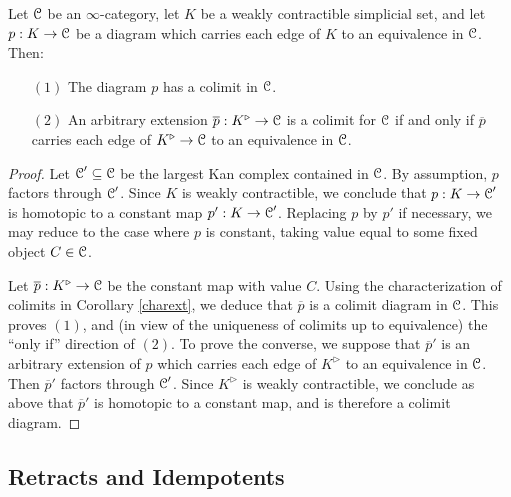 \begin{corollary}\label{silt}
Let $\operatorname{\mathcal{C}}$ be an $\infty$-category, let $K$ be a weakly contractible simplicial set, and let
$p: K \rightarrow \operatorname{\mathcal{C}}$ be a diagram which carries each edge of $K$ to an equivalence in $\operatorname{\mathcal{C}}$.
Then:
\begin{itemize}
\item[$(1)$] The diagram $p$ has a colimit in $\operatorname{\mathcal{C}}$.
\item[$(2)$] An arbitrary extension $\overline{p}: K^{\triangleright} \rightarrow \operatorname{\mathcal{C}}$
is a colimit for $\operatorname{\mathcal{C}}$ if and only if $\overline{p}$ carries each edge of
$K^{\triangleright} \rightarrow \operatorname{\mathcal{C}}$ to an equivalence in $\operatorname{\mathcal{C}}$.
\end{itemize}
\end{corollary}

\begin{proof}
Let $\operatorname{\mathcal{C}}' \subseteq \operatorname{\mathcal{C}}$ be the largest Kan complex contained in $\operatorname{\mathcal{C}}$. By assumption, $p$ factors through $\operatorname{\mathcal{C}}'$. Since $K$ is weakly contractible, we conclude that $p: K \rightarrow \operatorname{\mathcal{C}}'$ is homotopic to a constant map $p': K \rightarrow \operatorname{\mathcal{C}}'$. Replacing $p$ by $p'$ if necessary, we may reduce to the case where $p$ is constant, taking value equal to some
fixed object $C \in \operatorname{\mathcal{C}}$.

Let $\overline{p}: K^{\triangleright} \rightarrow \operatorname{\mathcal{C}}$ be the constant map with value $C$. Using the characterization of colimits in Corollary \ref{charext}, we deduce that $\overline{p}$ is a colimit diagram in $\operatorname{\mathcal{C}}$. This proves $(1)$, and (in view of the uniqueness of colimits up to equivalence) the ``only if'' direction of $(2)$. To prove the converse, we suppose that $\overline{p}'$ is an arbitrary extension of $p$ which carries each edge of $K^{\triangleright}$ to an equivalence in $\operatorname{\mathcal{C}}$. Then $\overline{p}'$ factors through $\operatorname{\mathcal{C}}'$. Since $K^{\triangleright}$ is weakly contractible, we conclude as above that $\overline{p}'$ is homotopic to a constant map, and is therefore a colimit diagram.
\end{proof}

\subsection{Retracts and Idempotents}\label{retrus}

